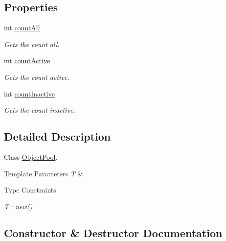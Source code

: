 \subsection*{Properties}
\begin{DoxyCompactItemize}
\item 
int \hyperlink{class_object_pool_a8a492d46b6230a2afe750a843e05a148}{count\+All}
\begin{DoxyCompactList}\small\item\em Gets the count all. \end{DoxyCompactList}\item 
int \hyperlink{class_object_pool_a1c7d97c9434247225b9d887072110c8f}{count\+Active}
\begin{DoxyCompactList}\small\item\em Gets the count active. \end{DoxyCompactList}\item 
int \hyperlink{class_object_pool_afd6b674fd2d20832cf244c2804e1df9a}{count\+Inactive}
\begin{DoxyCompactList}\small\item\em Gets the count inactive. \end{DoxyCompactList}\end{DoxyCompactItemize}


\subsection{Detailed Description}
Class \hyperlink{class_object_pool}{Object\+Pool}. 


\begin{DoxyTemplParams}{Template Parameters}
{\em T} & \\
\hline
\end{DoxyTemplParams}
\begin{Desc}
\item[Type Constraints]\begin{description}
\item[{\em T} : {\em new()}]\end{description}
\end{Desc}


\subsection{Constructor \& Destructor Documentation}
\mbox{\label{class_object_pool_ac7f7c5e592e12b2b9d7ed59ec64a2d6d}} 
